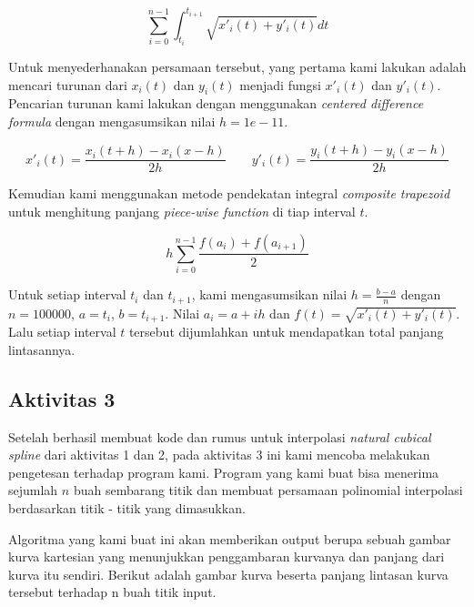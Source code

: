 \documentclass[11pt]{article}
\begin{document}
\[
    \sum_{i=0}^{n-1} \int_{t_i}^{t_{i+1}} \sqrt{x'_i(t)+y'_i(t)} dt
\]

Untuk menyederhanakan persamaan tersebut, yang pertama kami lakukan adalah mencari turunan dari $x_i(t)$ dan $y_i(t)$ menjadi fungsi $x'_i(t)$ dan $y'_i(t)$. Pencarian turunan kami lakukan dengan menggunakan \textit{centered difference formula} dengan mengasumsikan nilai $h = 1e-11$.

\[
    x'_i(t) = \frac{x_i(t+h) - x_i(x-h)}{2h}
    \quad \quad
    y'_i(t) = \frac{y_i(t+h) - y_i(x-h)}{2h}
\]

Kemudian kami menggunakan metode pendekatan integral \textit{composite trapezoid} untuk menghitung panjang \textit{piece-wise function} di tiap interval $t$.

\[
    h \sum_{i=0}^{n-1} \frac{f(a_i) + f(a_{i+1})}{2}
\]

Untuk setiap interval $t_i$ dan $t_{i+1}$, kami mengasumsikan nilai $h = \frac{b - a}{n}$ dengan $n = 100000$, $a = t_i$, $b = t_{i+1}$. Nilai $a_i = a + ih$ dan $f(t) = \sqrt{x'_i(t)+y'_i(t)}$. Lalu setiap interval $t$ tersebut dijumlahkan untuk mendapatkan total panjang lintasannya.

\subsection{Aktivitas 3}

Setelah berhasil membuat kode dan rumus untuk interpolasi \textit{natural cubical spline} dari aktivitas 1 dan 2, pada aktivitas 3 ini kami mencoba melakukan pengetesan terhadap program kami. Program yang kami buat bisa menerima sejumlah $n$ buah sembarang titik dan membuat persamaan polinomial interpolasi berdasarkan titik - titik yang dimasukkan.

\medskip

Algoritma yang kami buat ini akan memberikan output berupa sebuah gambar kurva kartesian yang menunjukkan penggambaran kurvanya dan panjang dari kurva itu sendiri. Berikut adalah gambar kurva beserta panjang lintasan kurva tersebut terhadap n buah titik input.

\medskip
\end{document}
